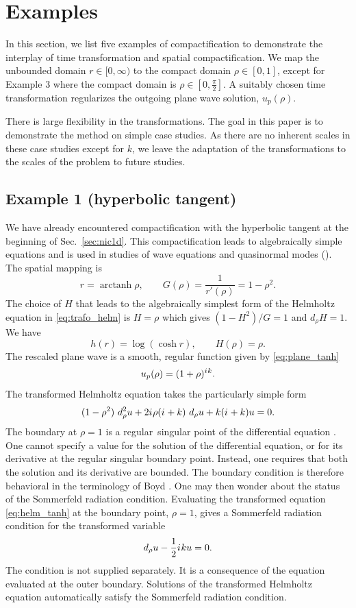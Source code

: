 \documentclass[draft,onefignum,onetabnum]{siamart190516}
\newcommand{\be}{\begin{equation}}
\newcommand{\ee}{\end{equation}}
\newcommand{\iu}{{i\mkern1mu}}
\DeclareMathOperator\arctanh{arctanh}
\begin{document}
\section{Examples}\label{sec:examples}
In this section, we list five examples of compactification to demonstrate the interplay of time transformation and spatial compactification. We map the unbounded domain $r\in[0,\infty)$ to the compact domain $\rho\in[0,1]$, except for Example 3 where the compact domain is $\rho\in[0,\frac{\pi}{2}]$. A suitably chosen time transformation regularizes the outgoing plane wave solution, $u_p(\rho)$.

There is large flexibility in the transformations. The goal in this paper is to demonstrate the method on simple case studies. As there are no inherent scales in these case studies except for $k$, we leave the adaptation of the transformations to the scales of the problem to future studies.

\subsection{Example 1 (hyperbolic tangent)}
We have already encountered compactification with the hyperbolic tangent at the beginning of Sec.~\ref{sec:nic1d}. This compactification leads to algebraically simple equations and is used in studies of wave equations and quasinormal modes (\cite{bizon2017global, bizon2020toy, donninger2020strichartz}). The spatial mapping is
\be\label{eq:ex1_mapping} r = \arctanh \rho, \qquad G(\rho) = \frac{1}{r'(\rho)} = 1-\rho^2. \ee
The choice of $H$ that leads to the algebraically simplest form of the Helmholtz equation in \eqref{eq:trafo_helm} is $H=\rho$ which gives $(1-H^2)/G=1$ and $d_\rho H=1$. We have
\[ h(r) = \log(\cosh r), \qquad H(\rho) = \rho. \]
The rescaled plane wave is a smooth, regular function given by \eqref{eq:plane_tanh}
\[ u_p(\rho) = (1+\rho)^{\iu k}.\]
The transformed Helmholtz equation takes the particularly simple form
\be\label{eq:helm_tanh} (1-\rho^2) \ d_\rho^2 u  + 2\iu \rho (\iu + k) \ d_\rho u + k (\iu+k) u = 0. \ee
The boundary at $\rho=1$ is a regular singular point of the differential equation \cite{powers2009boundary}. One cannot specify a value for the solution of the differential equation, or for its derivative at the regular singular boundary point. Instead, one requires that both the solution and its derivative are bounded. The boundary condition is therefore behavioral in the terminology of Boyd \cite{boyd2001chebyshev}. One may then wonder about the status of the Sommerfeld radiation condition. Evaluating the transformed equation \eqref{eq:helm_tanh} at the boundary point, $\rho=1$, gives a Sommerfeld radiation condition for the transformed variable
\be\label{eq:simple_sommerfeld} d_\rho u - \frac{1}{2} \iu k u = 0. \ee
The condition is not supplied separately. It is a consequence of the equation evaluated at the outer boundary. Solutions of the transformed Helmholtz equation automatically satisfy the Sommerfeld radiation condition.
\end{document}

